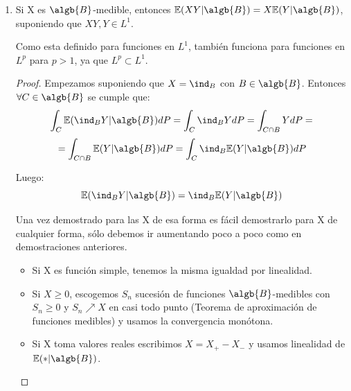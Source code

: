 \documentclass{apuntes}
\begin{document}
\begin{enumerate}
\begin{proof}
Para el siguiente paso lo único que hacemos es aplicar la definición de esperanza condicionada (el punto 2: $\forall B \in \algb{B}$, $\int_{B}\mathbb{E}(X|\algb{B})dP=\int_{B}XdP$):

\[
\lim_{n \rightarrow \infty}\int_B Y_ndP \leq \lim_{n \rightarrow \infty}\int_{\Omega} Y_ndP =
\]

Y otra vez usamos el TCD:
\[
= \int_B \lim_{n \rightarrow \infty} Y_ndP = 0
\]

Ya que $0 \leq X_n \nearrow X$ y por tanto $Y_n = X-X_n \searrow 0 $. Y con esto lo hemos demostrado en casi todo punto.

Ahora vamos a ver que se cumple en $L^1$, es decir que:
\[
\lim_{n \rightarrow \infty} \mathbb{E}(X_n|\algb{B}) - \mathbb{E}(X|\algb{B}) = \lim_{n \rightarrow \infty} \mathbb{E}(X-X_n|\algb{B}) = 0 \text{ en } L^1
\]

Por tanto:
\[
 \lim_{n \rightarrow \infty} \norm{\mathbb{E}(X-X_n|\algb{B})}_1 = \lim_{n \rightarrow \infty} \norm{\mathbb{E}(X|\algb{B}) - \mathbb{E}(X_n|\algb{B})}_1 =
\]
 
\[
= \lim_{n \rightarrow \infty} \mathbb{E}\abs{\mathbb{E}(Y_n|\algb{B})} = \lim_{n \rightarrow \infty} \mathbb{E}(Y_n) \text{ y por el TCD = }  \mathbb{E}(\lim_{n \rightarrow \infty}Y_n)=0
\]
\end{proof}
\item Si X es $\algb{B}$-medible, entonces $\mathbb{E}(XY|\algb{B}) = X\mathbb{E}(Y|\algb{B})$, suponiendo que $XY,Y \in L^1$. 

\obs Como esta definido para funciones en $L^1$, también funciona para funciones en $L^p$ para $p>1$, ya que $L^p \subset L^1$.
\begin{proof}
Empezamos suponiendo que $X=\ind_B$ con $B \in \algb{B}$. Entonces $\forall C \in \algb{B}$ se cumple que:
\[
\int_C \mathbb{E}(\ind_BY|\algb{B})dP = \int_C \ind_BYdP=\int_{C\cap B} YdP =
\]
\[
 =\int_{C\cap B} \mathbb{E}(Y|\algb{B})dP = \int_C \ind_B\mathbb{E}(Y|\algb{B})dP 
\]

Luego:
\[
\mathbb{E}(\ind_BY|\algb{B}) = \ind_B\mathbb{E}(Y|\algb{B})
\]

Una vez demostrado para las X de esa forma es fácil demostrarlo para X de cualquier forma, sólo debemos ir aumentando poco a poco como en demostraciones anteriores.
\begin{itemize}
\item Si X es función simple, tenemos la misma igualdad por linealidad.
\item Si $X \geq 0$, escogemos $S_n$ sucesión de funciones $\algb{B}$-medibles con $S_n\geq 0$ y $S_n \nearrow X$ en casi todo punto (Teorema de aproximación de funciones medibles) y usamos la convergencia monótona.
\item Si X toma valores reales escribimos $X=X_+ - X_-$ y usamos linealidad de $\mathbb{E}(*|\algb{B})$.


\end{itemize}
\end{proof}
\end{enumerate}
\end{document}
